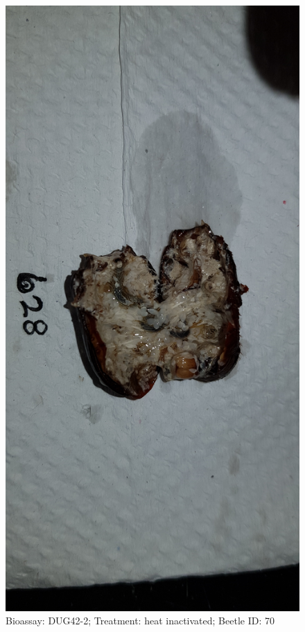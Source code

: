 \documentclass[11pt]{scrartcl}
\begin{document}
\begin{figure}[h!]
    \centering
    \includegraphics[width=\linewidth, height=\textheight, keepaspectratio]{uploads/btl.pm_image.804a1fbe4c486a85.4475673432203632385f5265702d3220284849292e6a7067.jpg}
    \caption{Bioassay: DUG42-2; Treatment: heat inactivated; Beetle ID: 70}
\end{figure}
\clearpage
\end{document}

